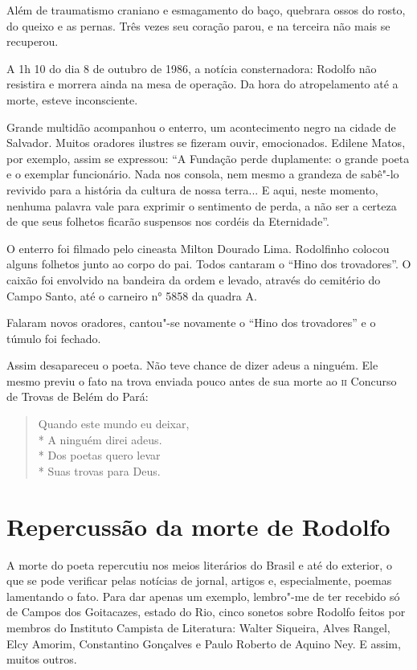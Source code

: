 Além de traumatismo craniano e esmagamento do baço, quebrara ossos do
rosto, do queixo e as pernas. Três vezes seu coração parou, e na
terceira não mais se recuperou.

A 1h 10 do dia 8 de outubro de 1986, a notícia consternadora: Rodolfo
não resistira e morrera ainda na mesa de operação. Da hora do
atropelamento até a morte, esteve inconsciente.

Grande multidão acompanhou o enterro, um acontecimento negro na cidade
de Salvador. Muitos oradores ilustres se fizeram ouvir, emocionados.
Edilene Matos, por exemplo, assim se expressou: ``A
Fundação perde duplamente: o grande poeta e o exemplar funcionário.
Nada nos consola, nem mesmo a grandeza de sabê"-lo revivido para a
história da cultura de nossa terra... E aqui, neste momento, nenhuma
palavra vale para exprimir o sentimento de perda, a não ser a certeza
de que seus folhetos ficarão suspensos nos cordéis da
Eternidade''.

O enterro foi filmado pelo cineasta Milton Dourado Lima. Rodolfinho
colocou alguns folhetos junto ao corpo do pai. Todos cantaram o
``Hino dos trovadores''. O caixão foi
envolvido na bandeira da ordem e levado, através do cemitério do Campo
Santo, até o carneiro n° 5858 da quadra A.

Falaram novos oradores, cantou"-se novamente o ``Hino dos
trovadores'' e o túmulo foi fechado.

Assim desapareceu o poeta. Não teve chance de dizer adeus a ninguém.
Ele mesmo previu o fato na trova enviada pouco antes de sua morte ao \textsc{ii}
Concurso de Trovas de Belém do Pará:


\begin{verse}
Quando este mundo eu deixar,\\*
A ninguém direi adeus.\\*
Dos poetas quero levar\\*
Suas trovas para Deus.
\end{verse}


\section{Repercussão da morte de Rodolfo}

A morte do poeta repercutiu nos meios literários do Brasil e até do
exterior, o que se pode verificar pelas notícias de jornal, artigos e,
especialmente, poemas lamentando o fato. Para dar apenas um exemplo,
lembro"-me de ter recebido só de Campos dos Goitacazes, estado do Rio,
cinco sonetos sobre Rodolfo feitos por membros do Instituto Campista de
Literatura: Walter Siqueira, Alves Rangel, Elcy Amorim, Constantino
Gonçalves e Paulo Roberto de Aquino Ney. E assim, muitos outros.

